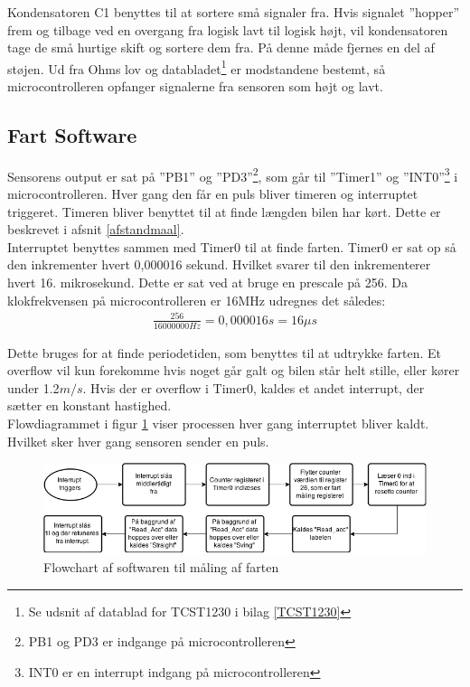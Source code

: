 Kondensatoren C1 benyttes til at sortere små signaler fra. Hvis signalet ”hopper” frem og tilbage ved en overgang fra logisk lavt til logisk højt, vil kondensatoren tage de små hurtige skift og sortere dem fra. På denne måde fjernes en del af støjen.  
Ud fra Ohms lov og databladet\footnote{Se udsnit af datablad for TCST1230 i bilag \ref{TCST1230}} er modstandene bestemt, så microcontrolleren opfanger signalerne fra sensoren som højt og lavt. \\


\subsection{Fart Software}
\label{fartmål_software}
Sensorens output er sat på ”PB1” og ”PD3”\footnote{PB1 og PD3 er indgange på microcontrolleren}, som går til ”Timer1” og ”INT0”\footnote{INT0 er en interrupt indgang på microcontrolleren} i microcontrolleren. Hver gang den får en puls  bliver timeren og interruptet triggeret. Timeren bliver benyttet til at finde længden bilen har kørt. Dette er beskrevet i afsnit \ref{afstandmaal}. \\

Interruptet benyttes sammen med Timer0 til at finde farten. Timer0 er sat op så den inkrementer hvert 0,000016 sekund. Hvilket svarer til den inkrementerer hvert 16. mikrosekund. Dette er sat ved at bruge en prescale på 256. Da klokfrekvensen på microcontrolleren er 16MHz udregnes det således:
\begin{align*}
\frac{256}{16 000 000Hz} = 0,000016 s = 16 \mu s 
\end{align*}

Dette bruges for at finde periodetiden, som benyttes til at udtrykke farten. Et overflow vil kun forekomme hvis noget går galt og bilen står helt stille, eller kører under 1.2\(m/s\). Hvis der er overflow i Timer0, kaldes et andet interrupt, der sætter en konstant hastighed. \\

Flowdiagrammet i figur \ref{fart_chart} viser processen hver gang interruptet bliver kaldt. Hvilket sker hver gang sensoren sender en puls. \\

\begin{figure}[h!]
\center
\includegraphics[scale=0.65]{./Graphics/fart_chart}
\caption{Flowchart af softwaren til måling af farten}
\label{fart_chart}
\end{figure}

